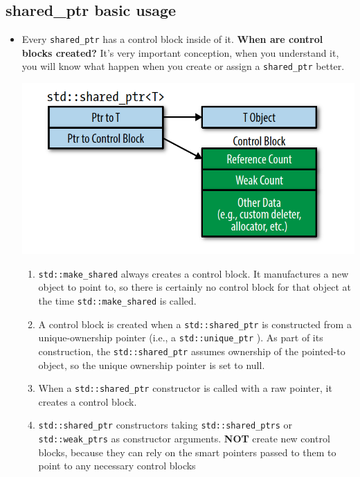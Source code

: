 \documentclass[a4paper,11pt,twoside]{book}
\begin{document}
\subsection{shared\_ptr basic usage}
\begin{itemize}
\item Every \texttt{shared\_ptr} has a control block inside of it. \textbf{When are control blocks created?}  It's very important conception, when you understand it, you will know what happen when you create or assign a \texttt{shared\_ptr} better. 
\begin{center}
\includegraphics[scale=0.6]{pics/shared.png}
\end{center}


\begin{enumerate}
	\item \texttt{std::make\_shared}  always creates a control block. It manufactures a new object to point to, so there is certainly no control block for that object at the time \texttt{std::make\_shared} is called.
	
	\item A control block is created when a \texttt{std::shared\_ptr} is constructed from a unique-ownership pointer (i.e., a \texttt{std::unique\_ptr} ). As part of its construction, the \texttt{std::shared\_ptr} assumes ownership of the pointed-to object, so the unique ownership pointer is set to null.
	
	\item When a \texttt{std::shared\_ptr} constructor is called with a raw pointer, it creates a control block.
	
	\item \texttt{std::shared\_ptr} constructors taking \texttt{std::shared\_ptrs} or \texttt{std::weak\_ptrs} as constructor arguments. \textbf{NOT} create new control blocks, because they can rely on the smart pointers passed to them to point to any necessary control blocks
	

\end{enumerate}
\end{itemize}
\end{document}
